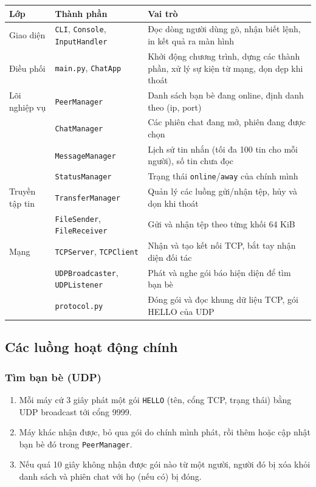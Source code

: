 \documentclass[a4paper,12pt]{article}
\newcommand{\code}[1]{\texttt{#1}}
\begin{document}
\begin{center}
\begin{tabularx}{\textwidth}{@{}l l X@{}}
\toprule
\textbf{Lớp} & \textbf{Thành phần} & \textbf{Vai trò} \\
\midrule
Giao diện & \code{CLI}, \code{Console}, \code{InputHandler} & Đọc dòng người dùng gõ, nhận biết lệnh, in kết quả ra màn hình \\
Điều phối & \code{main.py}, \code{ChatApp} & Khởi động chương trình, dựng các thành phần, xử lý sự kiện từ mạng, dọn dẹp khi thoát \\
Lõi nghiệp vụ & \code{PeerManager} & Danh sách bạn bè đang online, định danh theo (ip, port) \\
 & \code{ChatManager} & Các phiên chat đang mở, phiên đang được chọn \\
 & \code{MessageManager} & Lịch sử tin nhắn (tối đa 100 tin cho mỗi người), số tin chưa đọc \\
 & \code{StatusManager} & Trạng thái \code{online}/\code{away} của chính mình \\
Truyền tập tin & \code{TransferManager} & Quản lý các luồng gửi/nhận tệp, hủy và dọn khi thoát \\
 & \code{FileSender}, \code{FileReceiver} & Gửi và nhận tệp theo từng khối 64 KiB \\
Mạng & \code{TCPServer}, \code{TCPClient} & Nhận và tạo kết nối TCP, bắt tay nhận diện đối tác \\
 & \code{UDPBroadcaster}, \code{UDPListener} & Phát và nghe gói báo hiện diện để tìm bạn bè \\
 & \code{protocol.py} & Đóng gói và đọc khung dữ liệu TCP, gói HELLO của UDP \\
\bottomrule
\end{tabularx}
\end{center}

\subsection{Các luồng hoạt động chính}

\subsubsection{Tìm bạn bè (UDP)}
\begin{enumerate}
\item Mỗi máy cứ 3 giây phát một gói \code{HELLO} (tên, cổng TCP, trạng thái) bằng UDP broadcast tới cổng 9999.
\item Máy khác nhận được, bỏ qua gói do chính mình phát, rồi thêm hoặc cập nhật bạn bè đó trong \code{PeerManager}.
\item Nếu quá 10 giây không nhận được gói nào từ một người, người đó bị xóa khỏi danh sách và phiên chat với họ (nếu có) bị đóng.
\end{enumerate}
\end{document}
